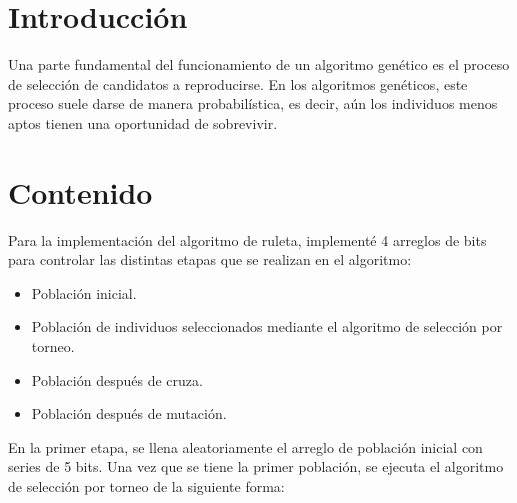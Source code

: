 \documentclass[11pt,letterpaper]{article}
\begin{document}


\section*{Introducción}
Una parte fundamental del funcionamiento de un algoritmo genético es el proceso de selección de candidatos a reproducirse. En los algoritmos genéticos, este proceso suele darse de manera probabilística, es decir, aún los individuos menos aptos tienen una oportunidad de sobrevivir.\\


\section*{Contenido}
Para la implementación del algoritmo de ruleta, implementé 4 arreglos de bits para controlar las distintas etapas que se realizan en el algoritmo:
\begin{itemize}
	\item Población inicial.
	\item Población de individuos seleccionados mediante el algoritmo de selección por torneo.
	\item Población después de cruza.
	\item Población después de mutación.
\end{itemize}

En la primer etapa, se llena aleatoriamente el arreglo de población inicial con series de 5 bits. Una vez que se tiene la primer población, se ejecuta el algoritmo de selección por torneo de la siguiente forma:


\end{document}
